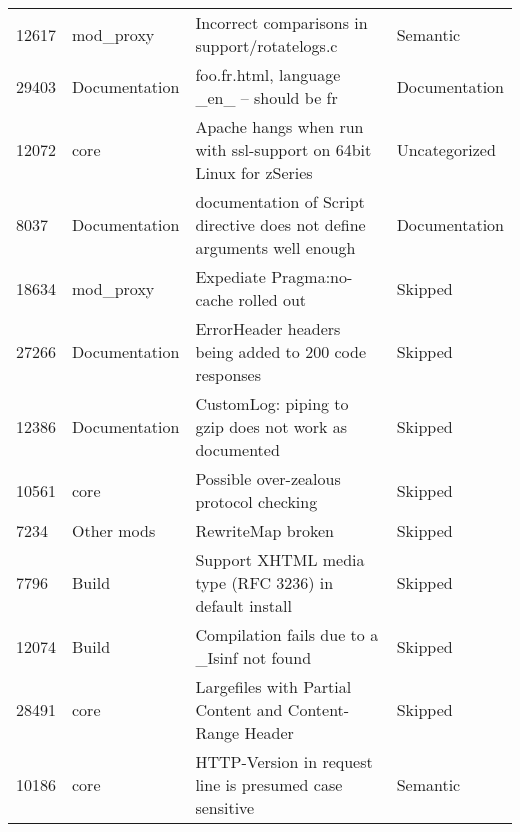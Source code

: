 \begin{longtable}[c]{llll}
12617  & mod\_proxy         & Incorrect comparisons in support/rotatelogs.c                                                                  & Semantic          \\
29403  & Documentation      & foo.fr.html, language \_en\_ -- should be fr                                                                   & Documentation     \\
12072  & core               & Apache hangs when run with ssl-support on 64bit Linux for zSeries                                              & Uncategorized     \\
8037   & Documentation      & documentation of Script directive does not define arguments well enough                                        & Documentation     \\
18634  & mod\_proxy         & Expediate Pragma:no-cache rolled out                                                                           & Skipped           \\
27266  & Documentation      & ErrorHeader headers being added to 200 code responses                                                          & Skipped           \\
12386  & Documentation      & CustomLog: piping to gzip does not work as documented                                                          & Skipped           \\
10561  & core               & Possible over-zealous protocol checking                                                                        & Skipped           \\
7234   & Other mods         & RewriteMap broken                                                                                              & Skipped           \\
7796   & Build              & Support XHTML media type (RFC 3236) in default install                                                         & Skipped           \\
12074  & Build              & Compilation fails due to a \_Isinf not found                                                                   & Skipped           \\
28491  & core               & Largefiles with Partial Content and Content-Range Header                                                       & Skipped           \\
10186  & core               & HTTP-Version in request line is presumed case sensitive                                                        & Semantic          \\

\end{longtable}
